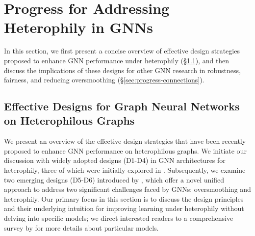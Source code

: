 \section{Progress for Addressing Heterophily in GNNs}

In this section, we first present a concise overview of effective design strategies proposed to enhance GNN performance under heterophily (\S\ref{sec:progress-designs}), and then discuss the implications of these designs for other GNN research in robustness, fairness, and reducing oversmoothing (\S\ref{sec:progress-connections}).
\subsection{Effective Designs for Graph Neural Networks on Heterophilous Graphs}
\label{sec:progress-designs}

We present an overview of the effective design strategies that have been recently proposed to enhance GNN performance on heterophilous graphs. We initiate our discussion with widely adopted designs (D1-D4) in GNN architectures for heterophily, three of which were initially explored in \cite{zhu2020beyond}. Subsequently, we examine two emerging designs (D5-D6) introduced by \citet{yan2022two}, which offer a novel unified approach to address two significant challenges faced by GNNs: oversmoothing and heterophily. Our primary focus in this section is to discuss the design principles and their underlying intuition for improving learning under heterophily without delving into specific models; we direct interested readers to a comprehensive survey by \citet{zheng2022graph} for more details about particular models.





